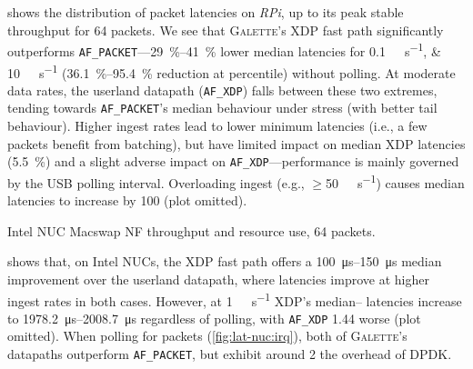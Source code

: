 \documentclass[comsoc, conference, times]{IEEEtran}
\newcommand{\ourtech}{\textsc{Galette}}
\newcommand{\afxdp}{\texttt{AF\_XDP}}
\newcommand{\afp}{\texttt{AF\_PACKET}}
\begin{document}
 shows the distribution of packet latencies on \emph{RPi}, up to its peak stable throughput for \qty{64}{\byte} packets.
We see that \ourtech{}'s XDP fast path significantly outperforms \afp{}---\qtyrange{29}{41}{\percent} lower median latencies for \qtylist{0.1;10}{\mega\bit\per\second} (\qtyrange{36.1}{95.4}{\percent} reduction at  percentile) without polling.
At moderate data rates, the userland datapath (\afxdp{}) falls between these two extremes, tending towards \afp's median behaviour under stress (with better tail behaviour).
Higher ingest rates lead to lower minimum latencies (i.e., a few packets benefit from batching), but have limited impact on median XDP latencies (\qty{5.5}{\percent}) and a slight adverse impact on \afxdp---performance is mainly governed by the USB polling interval.
Overloading ingest (e.g., $\ge$\qty{50}{\mega\bit\per\second}) causes median latencies to increase by \qty{100}{\times} (plot omitted).

\begin{table}
	\caption{Intel NUC Macswap NF throughput and resource use, \qty{64}{\byte} packets.\label{tab:nuc-64}}
	
	
\end{table}

 shows that, on Intel NUCs, the XDP fast path offers a \qtyrange{100}{150}{\micro\second} median improvement over the userland datapath, where latencies improve at higher ingest rates in both cases.
However, at \qty{1}{\giga\bit\per\second} XDP's median-- latencies increase to \qtyrange{1978.2}{2008.7}{\micro\second} regardless of polling, with \afxdp{} \qty{1.44}{\times} worse (plot omitted).
When polling for packets (\cref{fig:lat-nuc:irq}), both of \ourtech{}'s datapaths outperform \afp{}, but exhibit around \qty{2}{\times} the overhead of DPDK.
\end{document}

